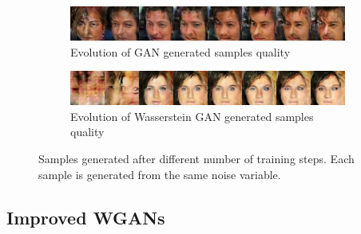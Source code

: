 \begin{figure}
  \begin{subfigure}[b]{\textwidth}
    \includegraphics[width=\textwidth]{figures/gan_progress}
    \caption{Evolution of GAN generated samples quality}
    \label{fig:gan_evolution}
  \end{subfigure}
  \begin{subfigure}[b]{\textwidth}
    \includegraphics[width=\textwidth]{figures/wgan_progress}
    \caption{Evolution of Wasserstein GAN generated samples quality}
    \label{fig:gan_evolution}
  \end{subfigure}
  \caption{Samples generated after different number of training steps. Each sample is generated from the same noise variable.}
  \label{fig:samples_evolution}
\end{figure}


\subsection{Improved WGANs}





